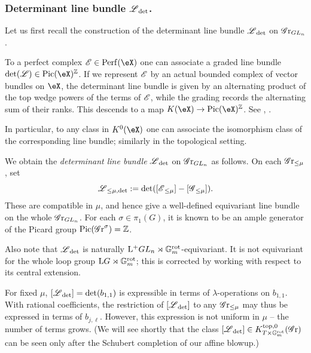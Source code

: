 \subsubsection{Determinant line bundle \texorpdfstring{$\operatorname{\mathscr{L}}_{\det}$}{L det}.}
Let us first recall the construction of the determinant line bundle $\operatorname{\mathscr{L}}_{\det}$ on $\operatorname{\mathscr{G}r}_{GL_n}$.

\begin{recollection}
To a perfect complex $\eE \in \Perf(\eX)$ one can associate a graded line bundle $\det(\eL) \in \Pic(\eX)^{\Z}$. If we represent $\operatorname{\mathscr{E}}$ by an actual bounded complex of vector bundles on $\eX$, the determinant line bundle is given by an alternating product of the top wedge powers of the terms of $\operatorname{\mathscr{E}}$, while the grading records the alternating sum of their ranks. This descends to a map $K(\eX) \to \Pic(\eX)^{\Z}$. See \cite[Tag 0FJI]{Sta}, \cite[Proposition 5.3, \S 5, \S 12]{BS16}. 

In particular, to any class in $K^{0}(\eX)$ one can associate the isomorphism class of the corresponding line bundle; similarly in the topological setting.
\end{recollection}


\begin{construction}
We obtain the \textit{determinant line bundle} $\operatorname{\mathscr{L}}_{\det}$ on $\operatorname{\mathscr{G}r}_{GL_n}$ as follows. On each $\operatorname{\mathscr{G}r}_{\leq \mu}$, set
\begin{equation*}
    \operatorname{\mathscr{L}}_{\leq \mu, \det} := \det([\operatorname{\mathscr{E}}_{\leq \mu}] - [\operatorname{\mathscr{G}}_{\leq \mu}]).
\end{equation*}
These are compatible in $\mu$, and hence give a well-defined equivariant line bundle on the whole $\operatorname{\mathscr{G}r}_{GL_n}$. For each $\sigma \in \pi_1(G)$, it is known to be an ample generator of the Picard group $\operatorname{Pic}(\operatorname{\mathscr{G}r}^{\sigma}) = \operatorname{\mathbb{Z}}$.

Also note that $\operatorname{\mathscr{L}}_{\det}$ is naturally $\mathrm{L^+} GL_n \rtimes \mathbb{G}_m^{\mathrm{rot}}$-equivariant. It is not equivariant for the whole loop group $\mathrm{L} G \rtimes \mathbb{G}_m^{\mathrm{rot}}$; this is corrected by working with respect to its central extension. 

For fixed $\mu$, $[\operatorname{\mathscr{L}}_{\det}] = \det(b_{1,1})$ is expressible in terms of $\lambda$-operations on $b_{1,1}$. With rational coefficients, the restriction of $[\operatorname{\mathscr{L}}_{\det}]$ to any $\operatorname{\mathscr{G}r}_{\leq \mu}$ may thus be expressed in terms of $b_{j, \ell}$. However, this expression is not uniform in $\mu$ -- the number of terms grows. (We will see shortly that the class $[\operatorname{\mathscr{L}}_{\det}] \in K^{\mathrm{top}, 0}_{T \times \mathbb{G}_m^{\mathrm{rot}}}(\operatorname{\mathscr{G}r})$ can be seen only after the Schubert completion of our affine blowup.)
\end{construction}


